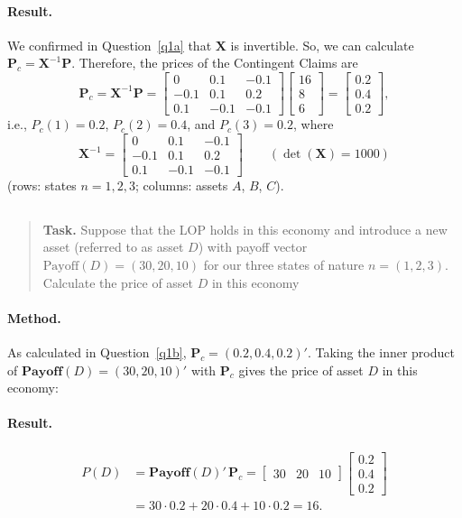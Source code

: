 \documentclass[11pt]{article}
\newcommand{\task}[1]{\begin{quote}\small\textbf{Task.} #1\end{quote}}
\begin{document}
\paragraph{Result.}
We confirmed in Question~\ref{q1a} that $\mathbf{X}$ is invertible. So, we can calculate
$\mathbf{P}_c = \mathbf{X}^{-1}\mathbf{P}$. Therefore, the prices of the Contingent Claims are
\[
  \mathbf{P}_c = \mathbf{X}^{-1}\mathbf{P}
  = \begin{bmatrix} 0 & 0.1 & -0.1 \\ -0.1 & 0.1 & 0.2 \\ 0.1 & -0.1 & -0.1 \end{bmatrix}
    \begin{bmatrix} 16 \\ 8 \\ 6 \end{bmatrix}
  = \begin{bmatrix} 0.2 \\ 0.4 \\ 0.2 \end{bmatrix},
\]
i.e., $P_c(1) = 0.2$, $P_c(2) = 0.4$, and $P_c(3) = 0.2$, where
\[
  \mathbf{X}^{-1} = \begin{bmatrix} 0 & 0.1 & -0.1 \\ -0.1 & 0.1 & 0.2 \\ 0.1 & -0.1 & -0.1 \end{bmatrix}
  \qquad (\det(\mathbf{X}) = 1000)
\]
(rows: states $n = 1, 2, 3$; columns: assets $A$, $B$, $C$).

\subsection{}\label{q1c}
\task{Suppose that the LOP holds in this economy and introduce a new asset (referred to as asset $D$) with payoff vector $\mathrm{Payoff}(D) = (30, 20, 10)$ for our three states of nature $n = (1, 2, 3)$. Calculate the price of asset $D$ in this economy}
\paragraph{Method.}
As calculated in Question~\ref{q1b}, $\mathbf{P}_c = (0.2, 0.4, 0.2)'$. Taking the inner product of
$\mathbf{Payoff}(D) = (30, 20, 10)'$ with $\mathbf{P}_c$ gives the price of asset $D$ in this economy:

\paragraph{Result.}
\begin{align*}
  P(D) &= \mathbf{Payoff}(D)'\,\mathbf{P}_c
        = \begin{bmatrix} 30 & 20 & 10 \end{bmatrix} \begin{bmatrix} 0.2 \\ 0.4 \\ 0.2 \end{bmatrix} \\
       &= 30 \cdot 0.2 + 20 \cdot 0.4 + 10 \cdot 0.2 = 16.
\end{align*}
\end{document}

